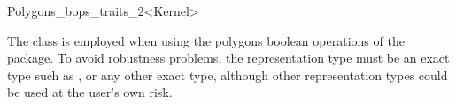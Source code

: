 
\ccRefPageBegin


\begin{ccRefClass}{Polygons_bops_traits_2<Kernel>}
    
\ccDefinition 
    The class 
    is employed when using the polygons boolean operations 
    of the  package.  
    To avoid robustness problems, 
    the representation type  must be an exact type such as
    ,
     or any other exact type,
    although other representation types could be used at the user's own risk.

 
\ccIsModel

\ccInheritsFrom
 
\end{ccRefClass} %

\ccRefPageEnd






